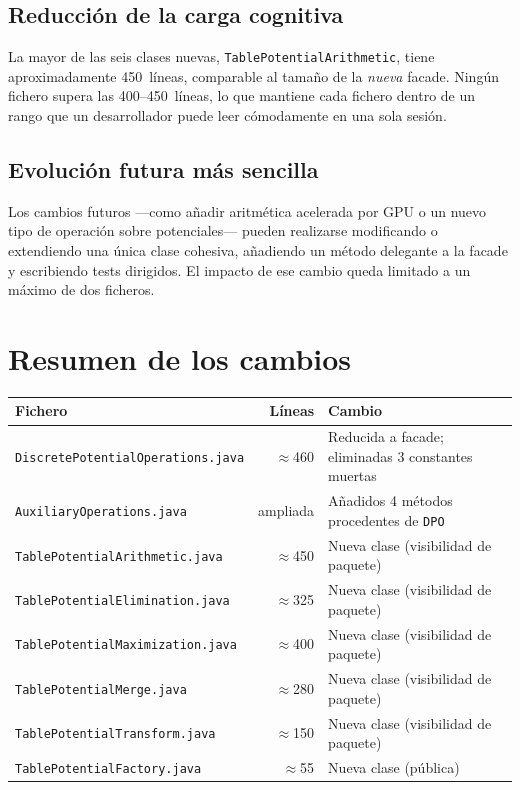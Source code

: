 \documentclass[11pt,a4paper]{article}
\newcommand{\code}[1]{\texttt{#1}}
\begin{document}
\subsection{Reducci\'on de la carga cognitiva}

La mayor de las seis clases nuevas, \code{TablePotentialArithmetic}, tiene
aproximadamente 450~l\'ineas, comparable al tama\~no de la \emph{nueva} facade.
Ning\'un fichero supera las 400--450~l\'ineas, lo que mantiene cada fichero dentro
de un rango que un desarrollador puede leer c\'omodamente en una sola sesi\'on.

\subsection{Evoluci\'on futura m\'as sencilla}

Los cambios futuros ---como a\~nadir aritm\'etica acelerada por GPU o un nuevo tipo
de operaci\'on sobre potenciales--- pueden realizarse modificando o extendiendo una
\'unica clase cohesiva, a\~nadiendo un m\'etodo delegante a la facade y escribiendo
tests dirigidos.  El impacto de ese cambio queda limitado a un m\'aximo de dos
ficheros.

\section{Resumen de los cambios}

\begin{center}
\begin{tabular}{lrl}
\toprule
\textbf{Fichero} & \textbf{L\'ineas} & \textbf{Cambio} \\
\midrule
\code{DiscretePotentialOperations.java} & $\approx$460 & Reducida a facade; eliminadas 3 constantes muertas \\
\code{AuxiliaryOperations.java}         & ampliada     & A\~nadidos 4 m\'etodos procedentes de \code{DPO} \\
\code{TablePotentialArithmetic.java}    & $\approx$450 & Nueva clase (visibilidad de paquete) \\
\code{TablePotentialElimination.java}   & $\approx$325 & Nueva clase (visibilidad de paquete) \\
\code{TablePotentialMaximization.java}  & $\approx$400 & Nueva clase (visibilidad de paquete) \\
\code{TablePotentialMerge.java}         & $\approx$280 & Nueva clase (visibilidad de paquete) \\
\code{TablePotentialTransform.java}     & $\approx$150 & Nueva clase (visibilidad de paquete) \\
\code{TablePotentialFactory.java}       & $\approx$55  & Nueva clase (p\'ublica) \\
\bottomrule
\end{tabular}
\end{center}
\end{document}
